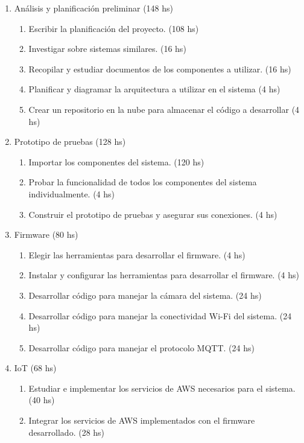 \documentclass[
11pt, %
]{plan}
\begin{document}
\begin{enumerate}
\item Análisis y planificación preliminar (148 hs)
	\begin{enumerate}
		\item Escribir la planificación del proyecto. (108 hs)
		\item Investigar sobre sistemas similares. (16 hs)
		\item Recopilar y estudiar documentos de los componentes a utilizar. (16 hs)
		\item Planificar y diagramar la arquitectura a utilizar en el sistema (4 hs)
		\item Crear un repositorio en la nube para almacenar el código a desarrollar (4 hs)
	\end{enumerate}
	
\item Prototipo de pruebas (128 hs)
	\begin{enumerate}
		\item Importar los componentes del sistema. (120 hs)
		\item Probar la funcionalidad de todos los componentes del sistema individualmente. (4 hs)
		\item Construir el prototipo de pruebas y asegurar sus conexiones. (4 hs)
	\end{enumerate}
	
\item Firmware (80 hs)
	\begin{enumerate}
		\item Elegir las herramientas para desarrollar el firmware. (4 hs)
		\item Instalar y configurar las herramientas para desarrollar el firmware. (4 hs)
		\item Desarrollar código para manejar la cámara del sistema. (24 hs)
		\item Desarrollar código para manejar la conectividad Wi-Fi del sistema. (24 hs)
		\item Desarrollar código para manejar el protocolo MQTT. (24 hs)
	\end{enumerate}
	
\item IoT (68 hs)
	\begin{enumerate}
		\item Estudiar e implementar los servicios de AWS necesarios para el sistema. (40 hs)
		\item Integrar los servicios de AWS implementados con el firmware desarrollado. (28 hs)
	\end{enumerate}


\end{enumerate}
\end{document}
